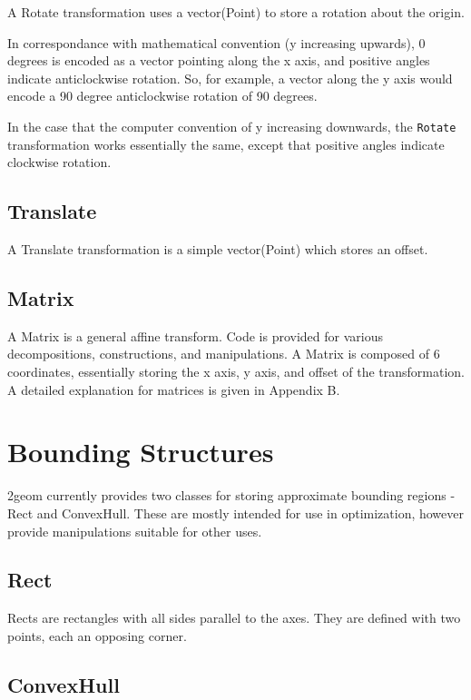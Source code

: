 \documentclass{book}
\newcommand{\code}[1]{\textsf{#1}}
\begin{document}
A \code{Rotate} transformation uses a vector(\code{Point}) to store
a rotation about the origin.

In correspondance with mathematical convention (y increasing upwards),
0 degrees is encoded as a vector pointing along the x axis, and positive
angles indicate anticlockwise rotation.  So, for example, a vector along
the y axis would encode a 90 degree anticlockwise rotation of 90 degrees.

In the case that the computer convention of y increasing downwards,
the \verb}Rotate} transformation works essentially the same, except
that positive angles indicate clockwise rotation.

\subsection{Translate}

A \code{Translate} transformation is a simple vector(\code{Point})
which stores an offset.

\subsection{Matrix}

A \code{Matrix} is a general affine transform.  Code is provided for
various decompositions, constructions, and manipulations.  A
\code{Matrix} is composed of 6 coordinates, essentially storing the
x axis, y axis, and offset of the transformation.  A detailed
explanation for matrices is given in Appendix B.

\section{Bounding Structures}

2geom currently provides two classes for storing approximate bounding
regions - \code{Rect} and \code{ConvexHull}.  These are mostly intended
for use in optimization, however provide manipulations suitable for
other uses.

\subsection{Rect}

\code{Rect}s are rectangles with all sides parallel to the axes. They
are defined with two points, each an opposing corner.

\subsection{ConvexHull}
\end{document}
